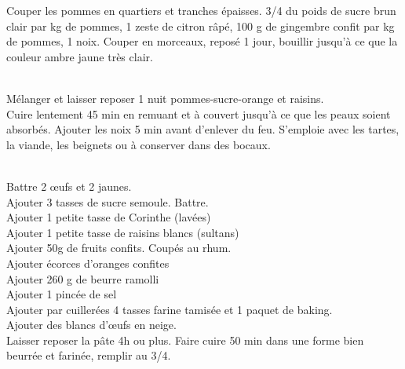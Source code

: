 \begin{minipage}[c]{\textwidth}
Couper les pommes en quartiers et tranches épaisses.  3/4 du poids de sucre brun clair par kg de pommes, 1 zeste de citron râpé, 100 g de gingembre confit par kg de pommes, 1 noix. Couper en morceaux, reposé 1 jour, bouillir jusqu'à ce que la couleur ambre jaune très clair.\\
\\

\end{minipage}

\begin{minipage}[c]{\textwidth}
Mélanger et laisser reposer 1 nuit pommes-sucre-orange et raisins.\\
Cuire lentement 45 min en remuant  et à couvert jusqu'à ce que les peaux soient absorbés. Ajouter les noix 5 min avant d'enlever du feu. S’emploie avec les tartes, la viande, les beignets ou à conserver dans des bocaux.\\
\\

\end{minipage}

\begin{minipage}[c]{\textwidth}
Battre 2 œufs et 2 jaunes. \\
Ajouter 3 tasses de sucre semoule. Battre. \\
Ajouter 1 petite tasse de Corinthe (lavées)\\
Ajouter 1 petite tasse de raisins blancs (sultans)\\
Ajouter 50g de fruits confits. Coupés au rhum.\\
Ajouter écorces d'oranges confites\\
Ajouter 260 g de beurre ramolli\\
Ajouter 1 pincée de sel\\
Ajouter par cuillerées 4 tasses farine tamisée et 1 paquet de baking.\\
Ajouter des blancs d'œufs en neige. \\
Laisser reposer la  pâte 4h ou plus. Faire cuire 50 min dans une forme bien beurrée et farinée, remplir au 3/4.\\
\\

\end{minipage}

